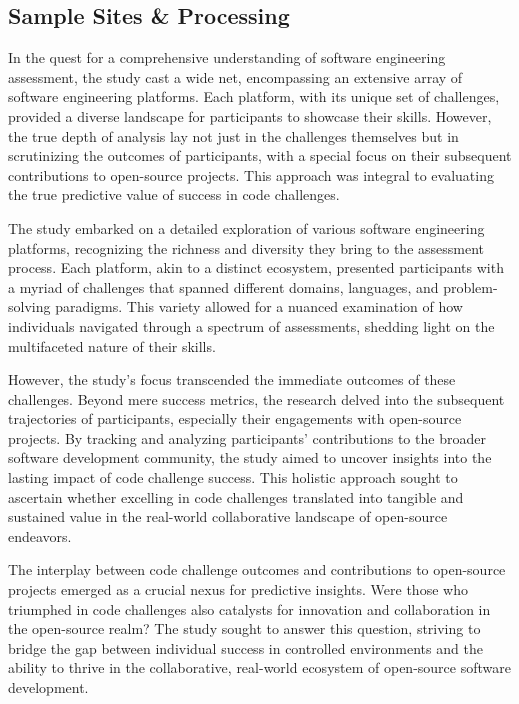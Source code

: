 \documentclass[
    a4paper, %
    10pt, %
    unnumberedsections, %
    twoside, %
]{LTJournalArticle}
\begin{document}
\subsection{Sample Sites \& Processing}

In the quest for a comprehensive understanding of software engineering assessment, the study cast a wide net, encompassing an extensive array of software engineering platforms. Each platform, with its unique set of challenges, provided a diverse landscape for participants to showcase their skills. However, the true depth of analysis lay not just in the challenges themselves but in scrutinizing the outcomes of participants, with a special focus on their subsequent contributions to open-source projects. This approach was integral to evaluating the true predictive value of success in code challenges.

The study embarked on a detailed exploration of various software engineering platforms, recognizing the richness and diversity they bring to the assessment process. Each platform, akin to a distinct ecosystem, presented participants with a myriad of challenges that spanned different domains, languages, and problem-solving paradigms. This variety allowed for a nuanced examination of how individuals navigated through a spectrum of assessments, shedding light on the multifaceted nature of their skills.

However, the study's focus transcended the immediate outcomes of these challenges. Beyond mere success metrics, the research delved into the subsequent trajectories of participants, especially their engagements with open-source projects. By tracking and analyzing participants' contributions to the broader software development community, the study aimed to uncover insights into the lasting impact of code challenge success. This holistic approach sought to ascertain whether excelling in code challenges translated into tangible and sustained value in the real-world collaborative landscape of open-source endeavors.

The interplay between code challenge outcomes and contributions to open-source projects emerged as a crucial nexus for predictive insights. Were those who triumphed in code challenges also catalysts for innovation and collaboration in the open-source realm? The study sought to answer this question, striving to bridge the gap between individual success in controlled environments and the ability to thrive in the collaborative, real-world ecosystem of open-source software development.
\end{document}
